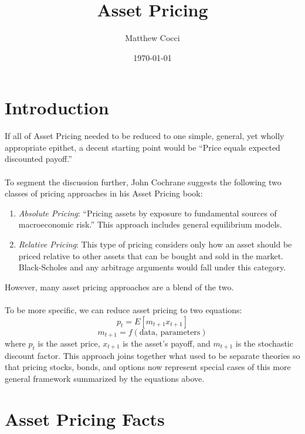\documentclass[a4paper,12pt]{scrartcl}
\author{Matthew Cocci}
\title{Asset Pricing}
\date{\today}
\begin{document}
\maketitle


\section{Introduction}

If all of Asset Pricing needed to be reduced to one simple,
general, yet wholly appropriate epithet, a decent starting
point would be ``Price equals expected discounted payoff.''
\\
\\
To segment the discussion further, John Cochrane suggests the
following two classes of pricing approaches in his 
Asset Pricing book:
\begin{enumerate}
    \item {\sl Absolute Pricing}: ``Pricing assets by exposure
	to fundamental sources of macroeconomic risk.'' This
	approach includes general equilibrium models. 
    \item {\sl Relative Pricing}: This type of pricing considers
	only how an asset should be priced relative to 
	other assets that can be bought and sold in the
	market. Black-Scholes and any arbitrage arguments
	would fall under this category.
\end{enumerate}
However, many asset pricing approaches are a blend of the two.
\\
\\
To be more specific, we can reduce asset pricing to two 
equations:
\begin{equation}
    p_t = E[m_{t+1} x_{t+1} ]
\end{equation}
\begin{equation}
    m_{t+1} = f(\text{data, parameters})
\end{equation}
where $p_t$ is the asset price, $x_{t+1}$ is the asset's payoff,
and $m_{t+1}$ is the stochastic discount factor.
This approach joins together what used to be separate theories so
that pricing stocks, bonds, and options now represent special
cases of this more general framework summarized by the equations above.


\newpage
\section{Asset Pricing Facts}
\end{document}
